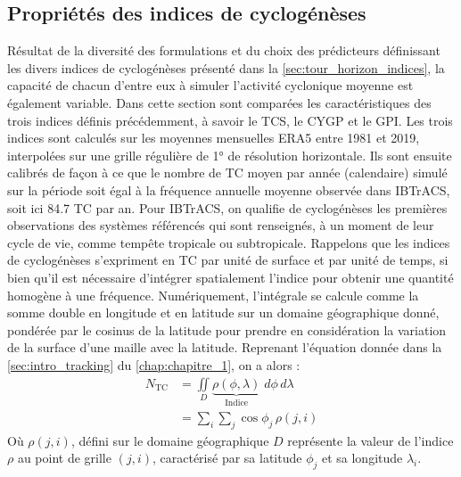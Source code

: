 \documentclass[../main.tex]{subfiles}
\begin{document}

\subsection{Propriétés des indices de cyclogénèses}\label{sec:proprietes_indices}

Résultat de la diversité des formulations et du choix des prédicteurs définissant les divers indices de cyclogénèses présenté dans la
\cref{sec:tour_horizon_indices}, la capacité de chacun d'entre eux à simuler l'activité cyclonique moyenne est également variable. Dans cette section sont
comparées les caractéristiques des trois indices définis précédemment, à savoir le TCS, le CYGP et le GPI. Les trois indices sont calculés sur les moyennes
mensuelles ERA5 entre \num{1981} et \num{2019}, interpolées sur une grille régulière de \ang{1} de résolution horizontale. Ils sont ensuite calibrés de façon à
ce que le nombre de TC moyen par année (calendaire) simulé sur la période soit égal à la fréquence annuelle moyenne observée dans IBTrACS, soit ici \num{84.7}
TC par an. Pour IBTrACS, on qualifie de cyclogénèses les premières observations des systèmes référencés qui sont renseignés, à un moment de leur cycle de vie,
comme tempête tropicale ou subtropicale. Rappelons que les indices de cyclogénèses s'expriment en TC par unité de surface et par unité de temps, si bien qu'il
est nécessaire d'intégrer spatialement l'indice pour obtenir une quantité homogène à une fréquence. Numériquement, l'intégrale se calcule comme la somme double
en longitude et en latitude sur un domaine géographique donné, pondérée par le cosinus de la latitude pour prendre en considération la variation de la surface
d'une maille avec la latitude. Reprenant l'équation donnée dans la \cref{sec:intro_tracking} du \cref{chap:chapitre_1}, on a alors :
%
\begin{align*}
    N_{\mathrm{TC}} &= \iint\limits_{D} \underbrace{\rho(\phi, \lambda)}_{\text{Indice}} \; d\phi \, d\lambda \\
                    &= \sum_{i} \sum_{j} \cos \phi_j \, \rho (j, i) 
\end{align*}
%
Où $\rho(j,i)$, défini sur le domaine géographique $D$ représente la valeur de l'indice $\rho$ au point de grille $(j,i)$, caractérisé par sa latitude $\phi_j$
et sa longitude $\lambda_i$.
\end{document}
